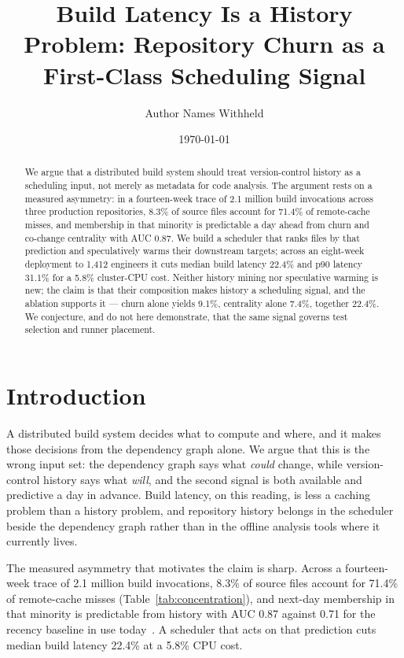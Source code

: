 \documentclass{anvil-paper}
\title{Build Latency Is a History Problem: Repository Churn as a First-Class Scheduling Signal}
\author{Author Names Withheld}
\date{\today}
\begin{document}
\maketitle

\begin{abstract}
We argue that a distributed build system should treat version-control history
as a scheduling input, not merely as metadata for code analysis. The argument
rests on a measured asymmetry: in a fourteen-week trace of 2.1 million build
invocations across three production repositories, 8.3\% of source files
account for 71.4\% of remote-cache misses, and membership in that minority is
predictable a day ahead from churn and co-change centrality with AUC 0.87. We
build a scheduler that ranks files by that prediction and speculatively warms
their downstream targets; across an eight-week deployment to 1{,}412
engineers it cuts median build latency 22.4\% and p90 latency 31.1\% for a
5.8\% cluster-CPU cost. Neither history mining nor speculative warming is new;
the claim is that their composition makes history a scheduling signal, and the
ablation supports it — churn alone yields 9.1\%, centrality alone 7.4\%,
together 22.4\%. We conjecture, and do not here demonstrate, that the same
signal governs test selection and runner placement.
\end{abstract}

\section{Introduction}
\label{sec:intro}

A distributed build system decides what to compute and where, and it makes
those decisions from the dependency graph alone. We argue that this is the
wrong input set: the dependency graph says what \emph{could} change, while
version-control history says what \emph{will}, and the second signal is both
available and predictive a day in advance. Build latency, on this reading, is
less a caching problem than a history problem, and repository history belongs
in the scheduler beside the dependency graph rather than in the offline
analysis tools where it currently lives.

The measured asymmetry that motivates the claim is sharp. Across a
fourteen-week trace of 2.1 million build invocations, 8.3\% of source files
account for 71.4\% of remote-cache misses (Table~\ref{tab:concentration}), and
next-day membership in that minority is predictable from history with AUC 0.87
against 0.71 for the recency baseline in use
today~\cite{lindqvist2021prefetch}. A scheduler that acts on that prediction
cuts median build latency 22.4\% at a 5.8\% CPU cost.
\end{document}
